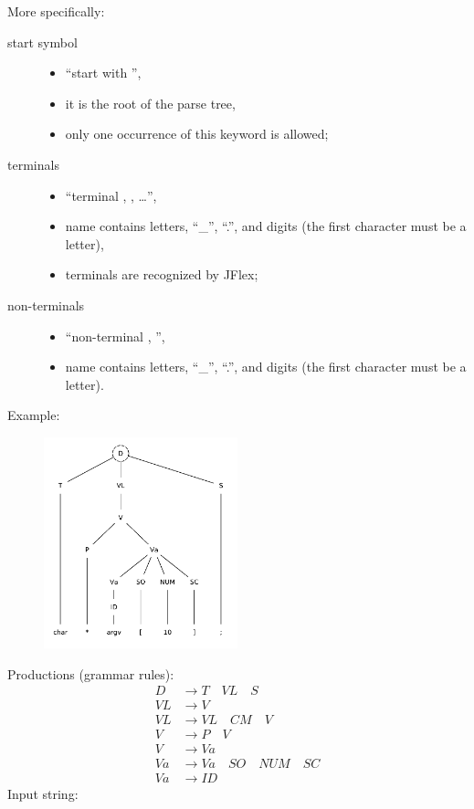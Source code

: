 More specifically:
\begin{description}
	\item[start symbol]
	\begin{itemize}
		\item
		``start with '',
		\item
		it is the root of the parse tree,
		\item
		only one occurrence of this keyword is allowed;
	\end{itemize}
	\item[terminals]
	\begin{itemize}
		\item
		``terminal , , \ldots'',
		\item
		 name contains letters, ``\_'', ``.'', and digits (the first character must be a letter),
		\item
		terminals are recognized by JFlex;
	\end{itemize}
	\item[non-terminals]
	\begin{itemize}
		\item
		``non-terminal , '',
		\item
		 name contains letters, ``\_'', ``.'', and digits (the first character must be a letter).
	\end{itemize}
\end{description}

Example:
\begin{figure}[H]
	\centerline{\includegraphics[width=0.5\textwidth]{img/18.pdf}}
\end{figure}
Productions (grammar rules):
\begin{align*}
	D &\to T \quad VL \quad S \\
	VL &\to V \\
	VL &\to VL \quad CM \quad V \\
	V &\to P \quad V \\
	V &\to Va \\
	Va &\to Va \quad SO \quad NUM \quad SC \\
	Va &\to ID
\end{align*}
Input string: 

